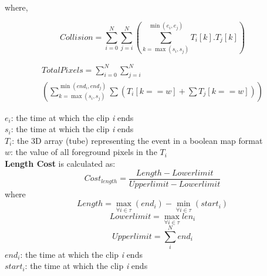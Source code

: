 \documentclass[conference]{IEEEtran}
\begin{document}
\begin{itemize}
    where,

    \begin{equation}\label{eqn:coll}
    Collision = \sum_{i=0}^{N}\sum_{j=i}^{N} \left(\sum_{k=\max(s_{i},s_{j})}^{\min(e_{i}, e_{j})}T_{i}[k].T_{j}[k]\right)
    \end{equation}

    \begin{equation}\label{eqn:totalp}
    \begin{split}
    TotalPixels = \sum_{i=0}^{N}\sum_{j=i}^{N} \\
    \left(
        \sum_{k=\max(s_{i},s_{j})}^{\min(end_{i}, end_{j})}
        \sum \left(T_{i}[k==w] + \sum T_{j}[k==w]\right) \right)
    \end{split}
    \end{equation}

    \(e_{i}\): the time at which the clip \textit{i} ends\\
    \(s_{i}\): the time at which the clip \textit{i} ends\\
    \(T_{i}\): the 3D array (tube) representing the event in a boolean map format\\
    \(w\): the value of all foreground pixels in the \(T_{i}\)\\

    \textbf{Length Cost} is calculated as:
    \begin{equation} \label{eqn:costlen}
    Cost_{length} = \frac{ Length - Lowerlimit}{ Upperlimit - Lowerlimit}
    \end{equation}
    where
    \begin{equation} \label{eqn:len}
    Length = \max_{\forall i \in \tau}(end_{i}) - \min_{\forall i \in \tau}(start_{i})
    \end{equation}
    \begin{equation} \label{eqn:lowerlim}
    Lowerlimit = \max_{\forall i \in \tau}len_{i}
    \end{equation}
    \begin{equation} \label{eqn:upperlim}
    Upperlimit = \sum_{i}^{N}end_{i}
    \end{equation}
    \(end_{i}\): the time at which the clip \textit{i} ends\\
    \(start_{i}\): the time at which the clip \textit{i} ends\\


\end{itemize}
\end{document}
